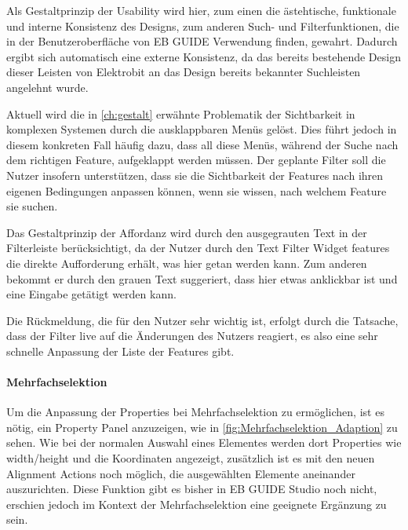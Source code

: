 Als Gestaltprinzip der Usability wird hier, zum einen die ästehtische, funktionale und interne Konsistenz des Designs, zum anderen Such- und Filterfunktionen, die in der Benutzeroberfläche von EB GUIDE Verwendung finden, gewahrt.
Dadurch ergibt sich automatisch eine externe Konsistenz, da das bereits bestehende Design dieser Leisten von Elektrobit an das Design bereits bekannter Suchleisten angelehnt wurde.

Aktuell wird die in \cref{ch:gestalt} erwähnte Problematik der Sichtbarkeit in komplexen Systemen durch die ausklappbaren Menüs gelöst.
Dies führt jedoch in diesem konkreten Fall häufig dazu, dass all diese Menüs, während der Suche nach dem richtigen Feature, aufgeklappt werden müssen.
Der geplante Filter soll die Nutzer insofern unterstützen, dass sie die Sichtbarkeit der Features nach ihren eigenen Bedingungen anpassen können, wenn sie wissen, nach welchem Feature sie suchen.

Das Gestaltprinzip der Affordanz wird durch den ausgegrauten Text in der Filterleiste berücksichtigt, da der Nutzer durch den Text \glqq Filter Widget features\grqq{} die direkte Aufforderung erhält, was hier getan werden kann.
Zum anderen bekommt er durch den grauen Text suggeriert, dass hier etwas anklickbar ist und eine Eingabe getätigt werden kann.

Die Rückmeldung, die für den Nutzer sehr wichtig ist, erfolgt durch die Tatsache, dass der Filter live auf die Änderungen des Nutzers reagiert, es also eine sehr schnelle Anpassung der Liste der Features gibt.

\paragraph{Mehrfachselektion}
Um die Anpassung der Properties bei Mehrfachselektion zu ermöglichen, ist es nötig, ein Property Panel anzuzeigen, wie in \cref{fig:Mehrfachselektion_Adaption} zu sehen.
Wie bei der normalen Auswahl eines Elementes werden dort Properties wie width/height und die Koordinaten angezeigt, zusätzlich ist es mit den neuen Alignment Actions noch möglich, die ausgewählten Elemente aneinander auszurichten.
Diese Funktion gibt es bisher in EB GUIDE Studio noch nicht, erschien jedoch im Kontext der Mehrfachselektion eine geeignete Ergänzung zu sein.

